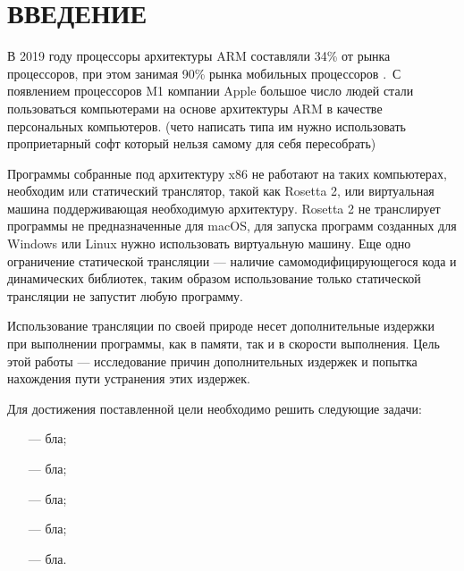\section*{ВВЕДЕНИЕ}

В 2019 году процессоры архитектуры ARM составляли 34\% от рынка процессоров, при этом занимая 90\% рынка мобильных процессоров \cite{arm_report}. С появлением процессоров M1 компании Apple большое число людей стали пользоваться компьютерами на основе архитектуры ARM в качестве персональных компьютеров. (чето написать типа им нужно использовать проприетарный софт который нельзя самому для себя пересобрать)

Программы собранные под архитектуру x86 не работают на таких компьютерах, необходим или статический транслятор, такой как Rosetta 2, или виртуальная машина поддерживающая необходимую архитектуру. Rosetta 2 не транслирует программы не предназначенные для macOS, для запуска программ созданных для Windows или Linux нужно использовать виртуальную машину. Еще одно ограничение статической трансляции --- наличие самомодифицирующегося кода и динамических библиотек, таким образом использование только статической трансляции не запустит любую программу. \cite{fast_bin}

Использование трансляции по своей природе несет дополнительные издержки при выполнении программы, как в памяти, так и в скорости выполнения. Цель этой работы --- исследование причин дополнительных издержек и попытка нахождения пути устранения этих издержек.

Для достижения поставленной цели необходимо решить следующие задачи:

\begin{itemize}[leftmargin=1.6\parindent]
	\item[---] бла;
	\item[---] бла;
	\item[---] бла;
	\item[---] бла;
	\item[---] бла.
\end{itemize}

\pagebreak
